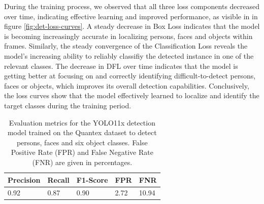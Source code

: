 \documentclass[
  man,floatsintext]{apa6}
\begin{document}
During the training process, we observed that all three loss components decreased over time, indicating effective learning and improved performance, as visible in in figure \ref{fig:det-loss-curves}. A steady decrease in Box Loss indicates that the model is becoming increasingly accurate in localizing persons, faces and objects within frames. Similarly, the steady convergence of the Classification Loss reveals the model's increasing ability to reliably classifiy the detected instance in one of the relevant classes. The decrease in DFL over time indicates that the model is getting better at focusing on and correctly identifying difficult-to-detect persons, faces or objects, which improves its overall detection capabilities. Conclusively, the loss curves show that the model effectively learned to localize and identify the target classes during the training period.

\begin{table}[tbp]

\begin{center}
\begin{threeparttable}

\caption{\label{tab:det-detection-metrics-detailed}Evaluation metrics for the YOLO11x detection model trained on the Quantex dataset to detect persons, faces and six object classes. False Positive Rate (FPR) and False Negative Rate (FNR) are given in percentages.}

\begin{tabular}{lllll}
\toprule
Precision & \multicolumn{1}{c}{Recall} & \multicolumn{1}{c}{F1-Score} & \multicolumn{1}{c}{FPR} & \multicolumn{1}{c}{FNR}\\
\midrule
0.92 & 0.87 & 0.90 & 2.72 & 10.94\\
\bottomrule
\end{tabular}

\end{threeparttable}
\end{center}

\end{table}
\end{document}
